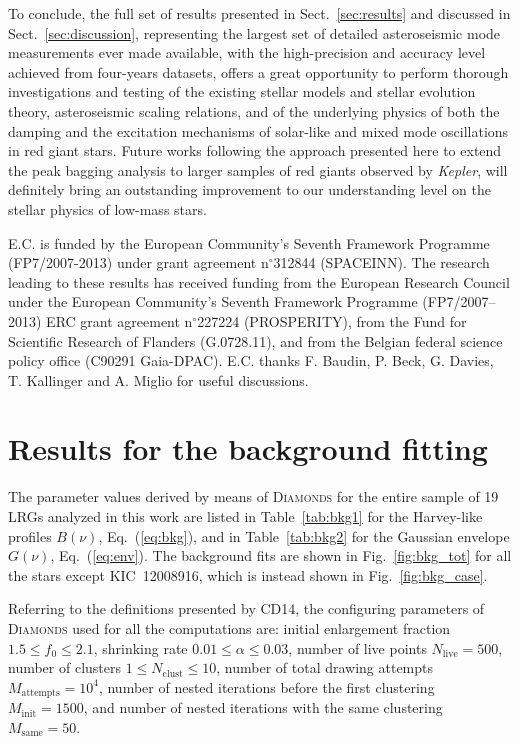 \documentclass[structabstract]{aa}
\newcommand{\Kepler}{\textit{Kepler}}
\newcommand{\diamonds}{\textsc{D\large{iamonds}}}
\newcommand{\kic}{KIC~12008916}
\begin{document}
To conclude, the full set of results presented in Sect.~\ref{sec:results} and discussed in Sect.~\ref{sec:discussion}, representing the largest set of detailed asteroseismic mode measurements ever made available, with the high-precision and accuracy level achieved from four-years datasets, offers a great opportunity to perform thorough investigations and testing of the existing stellar models and stellar evolution theory, asteroseismic scaling relations, and of the underlying physics of both the damping and the excitation mechanisms of solar-like and mixed mode oscillations in red giant stars. Future works following the approach presented here to extend the peak bagging analysis to larger samples of red giants observed by \Kepler, will definitely bring an outstanding improvement to our understanding level on the stellar physics of low-mass stars.  

\begin{acknowledgements}
E.C. is funded by the European Community's Seventh Framework Programme (FP7/2007-2013) under grant agreement n$^\circ$312844 (SPACEINN).
The research leading to these results has received funding from the European
Research Council under the European Community's Seventh Framework Programme
(FP7/2007--2013) ERC grant agreement n$^\circ$227224 (PROSPERITY), 
from the Fund for Scientific Research of Flanders (G.0728.11), 
and from the Belgian federal science policy office (C90291 Gaia-DPAC).
E.C. thanks F. Baudin, P. Beck, G. Davies, T. Kallinger and A. Miglio for useful discussions.
\end{acknowledgements}

   

\appendix
\section{Results for the background fitting}
\label{sec:bkg_results}
The parameter values derived by means of \diamonds\,\,for the entire sample of 19 LRGs analyzed in this work are listed in Table~\ref{tab:bkg1} for the Harvey-like profiles $B \left( \nu \right)$, Eq.~(\ref{eq:bkg}), and in Table~\ref{tab:bkg2} for the Gaussian envelope $G \left( \nu \right)$, Eq.~(\ref{eq:env}).
The background fits are shown in Fig.~\ref{fig:bkg_tot} for all the stars except \kic, which is instead shown in Fig.~\ref{fig:bkg_case}. 

Referring to the definitions presented by CD14, the configuring parameters of \diamonds\,\,used for all the computations are: initial enlargement fraction $1.5 \leq f_0 \leq 2.1$, shrinking rate $ 0.01 \leq \alpha \leq 0.03$, number of live points $N_\mathrm{live} = 500$, number of clusters $1 \leq N_\mathrm{clust} \leq 10$, number of total drawing attempts $M_\mathrm{attempts} = 10^4$, number of nested iterations before the first clustering $M_\mathrm{init} = 1500$, and number of nested iterations with the same clustering $M_\mathrm{same} = 50$.
\end{document}
